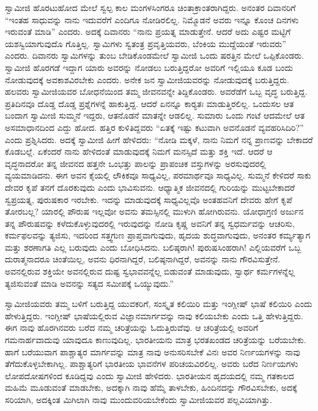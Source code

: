  ಸ್ವಾಮೀಜಿ ಹೊರಟುಹೋದ ಮೇಲೆ ಸ್ವಲ್ಪ ಕಾಲ ಮಂಗಳಸಿಂಗರೂ ಚಿಂತಾಕ್ರಾಂತರಾಗಿದ್ದರು. ಅನಂತರ ದಿವಾನರಿಗೆ “ಇಂತಹ ಸಾಧುವನ್ನು ನಾನು ಇದುವರೆಗೆ ಎಂದಿಗೂ ನೋಡಿರಲಿಲ್ಲ. ನಿಮ್ಮೊಡನೆ ಅವರು ಇನ್ನೂ ಕೊಂಚ ದಿನಗಳು ಇರುವಂತೆ ಮಾಡಿ” ಎಂದರು. ಅದಕ್ಕೆ ದಿವಾನರು “ನಾನು ಪ್ರಯತ್ನ ಮಾಡುತ್ತೇನೆ. ಆದರೆ ಅದು ಎಷ್ಟರ ಮಟ್ಟಿಗೆ ಯಶಸ್ವಿಯಾಗುವುದೊ ಗೊತ್ತಿಲ್ಲ. ಸ್ವಾಮಿಗಳು ಸ್ವತಂತ್ರ ಪ್ರವೃತ್ತಿಯವರು, ಬೆಂಕಿಯ ಮುದ್ದೆಯಂತೆ ಇರುವರು” ಎಂದರು. ದಿವಾನರು ಸ್ವಾಮಿಗಳನ್ನು ತುಂಬ ಬೇಡಿಕೊಂಡಮೇಲೆ ಸ್ವಾಮೀಜಿ ಒಂದು ಷರತ್ತಿನ ಮೇಲೆ ಒಪ್ಪಿಕೊಂಡರು. ಸ್ವಾಮೀಜಿ ಹೊರಗಡೆ ಇದ್ದಾಗ ಯಾರು ಅವರನ್ನು ನೋಡಲು ಬರುತ್ತಿದ್ದರೋ ಅವರಿಗೆ ಇಲ್ಲಿಯೂ ಕೂಡ ಬಂದು ನೋಡುವುದಕ್ಕೆ ಅವಕಾಶವಿರಬೇಕು ಎಂದರು. ಅನೇಕ ಜನ ಸ್ವಾಮೀಜಿಯವರನ್ನು ನೋಡುವುದಕ್ಕೆ ಬರುತ್ತಿದ್ದರು. ಹಲವರು ಸ್ವಾಮೀಜಿಯವರ ಬೋಧನೆಯಿಂದ ತಮ್ಮ ಜೀವನವನ್ನೇ ತಿದ್ದಿಕೊಂಡರು. ಅವರೆಡೆಗೆ ಒಬ್ಬ ವೃದ್ಧ ಬರುತ್ತಿದ್ದ. ಪ್ರತಿದಿನವೂ ದೊಡ್ಡ ದೊಡ್ಡ ಪ್ರಶ್ನೆಗಳನ್ನೆ ಹಾಕುತ್ತಿದ್ದ. ಆದರೆ ಏನನ್ನೂ ಕಾರ‍್ಯತಃ ಮಾಡುತ್ತಿರಲಿಲ್ಲ. ಒಂದುಸಲ ಆತ ಬಂದಾಗ ಸ್ವಾಮೀಜಿ ಸುಮ್ಮನೆ ಇದ್ದರು, ಆತನೊಡನೆ ಮಾತನ್ನೇ ಆಡಲಿಲ್ಲ. ಸುಮಾರು ಒಂದು ಗಂಟೆ ಆದಮೇಲೆ ಆತ ಅಸಮಾಧಾನದಿಂದ ಎದ್ದು ಹೋದ. ಹತ್ತಿರ ಕುಳಿತಿದ್ದವರು “ಏತಕ್ಕೆ ಇಷ್ಟು ಕಟುವಾಗಿ ಅವನೊಡನೆ ವ್ಯವಹರಿಸಿದಿರಿ?” ಎಂದು ಪ್ರಶ್ನಿಸಿದರು. ಅದಕ್ಕೆ ಸ್ವಾಮೀಜಿ ಹೀಗೆ ಹೇಳಿದರು: “ನೋಡಿ ಮಕ್ಕಳೆ, ನಾನು ನಿಮಗೆ ನನ್ನ ಪ್ರಾಣವನ್ನು ಬೇಕಾದರೆ ಕೊಡಬಲ್ಲೆ. ಏಕೆಂದರೆ ನಾನು ಹೇಳಿದಂತೆ ಮಾಡುವುದಕ್ಕೆ ನಿಮಗೆ ಮನಸ್ಸಿದೆ ಮತ್ತು ಶಕ್ತಿ ಇದೆ. ಆದರೆ ಆ ವೃದ್ಧನಾದರೋ ತನ್ನ ಜೀವನದ ಹತ್ತನೇ ಒಂಭತ್ತು ಪಾಲನ್ನು ಪ್ರಾಪಂಚಿಕ ವಸ್ತುಗಳನ್ನು ಅರಸುವುದರಲ್ಲಿ ವ್ಯಯಮಾಡಿದನು. ಈಗ ಅವನ ಕೈಯಲ್ಲಿ ಲೌಕಿಕವೂ ಸಾಧ್ಯವಿಲ್ಲ, ಪರಮಾರ್ಥವೂ ಸಾಧ್ಯವಿಲ್ಲ. ಸುಮ್ಮನೆ ಕೇಳಿದರೆ ಸಾಕು ದೇವರ ಕೃಪೆ ತನಗೆ ದೊರಕುವುದು ಎಂದು ಭಾವಿಸುವನು. ಆಧ್ಯಾತ್ಮಿಕ ಜೀವನದಲ್ಲಿ ಗುರಿಯನ್ನು ಮುಟ್ಟಬೇಕಾದರೆ ಸ್ವಪ್ರಯತ್ನ, ಪುರುಷಕಾರ ಇರಬೇಕು. ಇದನ್ನು ಮಾಡುವುದಕ್ಕೆ ಸಾಧ್ಯವಿಲ್ಲವೊ ಅಂತಹವನಿಗೆ ದೇವರು ಹೇಗೆ ಕೃಪೆ ತೋರಬಲ್ಲ? ಯಾರಲ್ಲಿ ಪೌರುಷ ಇಲ್ಲವೋ ಅವನು ತಮಸ್ಸಿನಲ್ಲಿ ಮುಳುಗಿ ಹೋಗಿರುವನು. ಯೋಧಾಗ್ರಣಿ ಅರ್ಜುನ ತನ್ನ ಪೌರುಷವನ್ನು ಕಳೆದುಕೊಳ್ಳುವುದರಲ್ಲಿ ಇರುವುದನ್ನು ನೋಡಿ ಕೃಷ್ಣ ಅವನಿಗೆ ತನ್ನ ಸ್ವಧರ್ಮವನ್ನು ಆಚರಿಸು, ಕರ್ಮಫಲವನ್ನು ತ್ಯಜಿಸು, ಇದರಿಂದ ಸತ್ತ್ವಗುಣ ಪ್ರಾಪ್ತವಾಗುವುದು, ಹೃದಯ ಶುದ್ಧವಾಗುವುದು, ಅನಂತರ ಕರ್ಮ್ಯತ್ಯಾಗ ಮತ್ತು ಶರಣಾಗತಿ ಎಲ್ಲ ಬರುವುದು ಎಂದು ಬೋಧಿಸಿದನು. ಬಲಿಷ್ಠರಾಗಿ! ಪುರುಷಸಿಂಹರಾಗಿ! ಎಲ್ಲಿಯವರೆಗೆ ಒಬ್ಬ ದುರಾತ್ಮನಾದರೂ ಚಿಂತೆಯಿಲ್ಲ, ಅವನು ಧಿರನಾಗಿದ್ದರೆ, ಬಲಿಷ್ಠನಾಗಿದ್ದರೆ, ಅವನನ್ನು ನಾನು ಗೌರವಿಸುತ್ತೇನೆ. ಅವನಲ್ಲಿರುವ ಶಕ್ತಿಯೇ ಅವನಲ್ಲಿರುವ ದುಷ್ಟ ಸ್ವಭಾವವನ್ನೆಲ್ಲ ಬಿಡುವಂತೆ ಮಾಡುವುದು, ಸ್ವಾರ್ಥ ಕರ್ಮಗಳನ್ನೆಲ್ಲ ತ್ಯಜಿಸುವಂತೆ ಮಾಡಿ ಅವನನ್ನು ಸತ್ಯದ ಸಮೀಪಕ್ಕೆ ಒಯ್ಯುವುದು.” 

 ಸ್ವಾಮೀಜಿಯವರು ತಮ್ಮ ಬಳಿಗೆ ಬರುತ್ತಿದ್ದ ಯುವಕರಿಗೆ, ಸಂಸ್ಕೃತ ಕಲಿಯಿರಿ ಮತ್ತು ಇಂಗ್ಲೀಷ್ ಭಾಷೆ ಕಲಿಯಿರಿ ಎಂದು ಹೇಳುತ್ತಿದ್ದರು. ಇಂಗ್ಲೀಷ್ ಭಾಷೆಯಲ್ಲಿರುವ ವಿಜ್ಞಾನಮಾರ್ಗವನ್ನು ನಾವು ಕಲಿಯಬೇಕು ಎಂದು ಒತ್ತಿ ಹೇಳುತ್ತಿದ್ದರು. ಈಗ ನಾವು ಹೊರಗಿನವರು ಬರೆದ ನಮ್ಮ ಚರಿತ್ರೆಯನ್ನು ಓದುತ್ತಿರುವೆವು. ಆ ಚರಿತ್ರೆಯಲ್ಲಿ ಅವರಿಗೆ ಗಮನಾರ್ಹವಾದುವು ಯಾವುದೂ ಕಾಣುವುದಿಲ್ಲ. ಭಾರತೀಯನು ಮಾತ್ರ ಭರತಖಂಡದ ಚರಿತ್ರೆಯನ್ನು ಬರೆಯಬೇಕು. ಹಾಗೆ ಬರೆಯುವಾಗ ಪಾಶ್ಚಾತ್ಯರ ಮಾರ್ಗವನ್ನು ಮಾತ್ರ ನಾವು ಅನುಸರಿಸಬೇಕೆ ವಿನಃ ಅವರ ನಿರ್ಣಯಗಳನ್ನು ನಾವು ತೆಗೆದುಕೊಳ್ಳಬೇಕಾಗಿಲ್ಲ. ಪಾಶ್ಚಾತ್ಯರಿಗೆ ಭಾರತೀಯ ಭಾವನೆಗಳ ಪರಿಚಯವಿರಲಿಲ್ಲ. ಅವರು ಬರೆದ ನಿರ್ಣಯಗಳು ಲೋಪದೋಷಗಳಿಂದ ಕೂಡಿದ್ದವು ಎಂದು ಸ್ವಾಮೀಜಿ ಹೇಳಿದರು. ಭಾರತೀಯನ ಹೃದಯದಲ್ಲಿ ನಮ್ಮ ಗತಕಾಲದ ಮಹಿಮೆ ಮೂಡುವಂತೆ ಮಾಡಬೇಕು, ಅದಕ್ಕಾಗಿ ನಾವು ಹೆಮ್ಮೆ ತಾಳಬೇಕು, ಹಿಂದಿನದನ್ನು ಗೌರವಿಸಬೇಕು, ಅದಕ್ಕೆ ಸರಿಯಾಗಿ, ಅದಕ್ಕಿಂತ ಮಿಗಿಲಾಗಿ ನಾವು ಮುಂದುವರಿಯಬೇಕೆಂದು ಸ್ವಾಮೀಜಿಯವರ ಪಲ್ಲವಿಯಾಗಿತ್ತು. 

